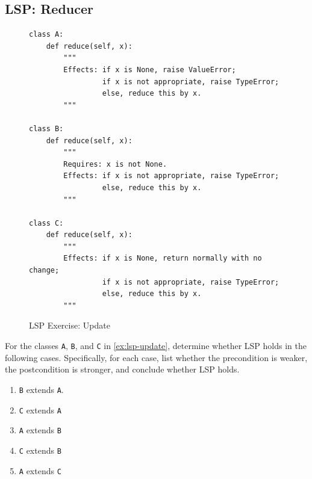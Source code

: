\documentclass[oneside,11pt,dvipsnames]{book}
\newcommand{\sol}[1]{\iftoggle{usesol}{\textbf{Sol:} #1}{}}
\newcommand{\code}[1]{\texttt{#1}}
\begin{document}
\subsection{LSP: Reducer}
\begin{figure}
\begin{lstlisting}
class A:
    def reduce(self, x):
        """
        Effects: if x is None, raise ValueError;
                 if x is not appropriate, raise TypeError;
                 else, reduce this by x.
        """

class B:
    def reduce(self, x):
        """
        Requires: x is not None.
        Effects: if x is not appropriate, raise TypeError;
                 else, reduce this by x.
        """

class C:
    def reduce(self, x):
        """
        Effects: if x is None, return normally with no change;
                 if x is not appropriate, raise TypeError;
                 else, reduce this by x.
        """
\end{lstlisting}
\caption{LSP Exercise: Update}\label{ex:lsp-update}
\end{figure}

For the classes \code{A}, \code{B}, and \code{C} in \autoref{ex:lsp-update}, determine whether LSP holds in the following cases. Specifically, for each case, list whether the precondition is weaker, the postcondition is stronger, and conclude whether LSP holds.
\begin{enumerate}
    \item \code{B} extends \code{A}.
    \sol{B's pre is stronger than A's because it requires that $x$ is not None while A's has no pre. \textbf{LSP does not hold}. The posts of \code{A} and \code{B} are the same}
    \item \code{C} extends \code{A}
    \sol{Pre's are the same (both are total methods). C's post is stronger than A's because it allows $x$ to be None while A's does not. \textbf{LSP holds}.}
    \item \code{A} extends \code{B}
    \sol{A's pre is weaker than B's because A has no pre. The posts for both are essentially the same because B's pre explicitly requires $x$ to be not None. \textbf{LSP holds}. Note that you might argue A's post is stronger, which is also fine and also means LSP holds.}
    \item \code{C} extends \code{B}
    \sol{C's pre is weaker than B's because C allows $x$ to be None while B does not. The posts are the same. \textbf{LSP does not hold}.}
    \item \code{A} extends \code{C}
\end{enumerate}
\end{document}
